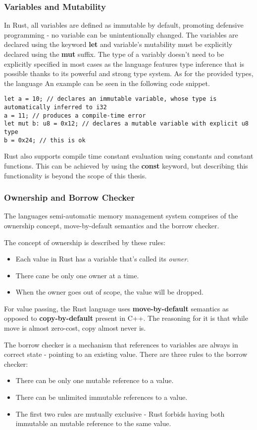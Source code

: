 \subsubsection{Variables and Mutability}
In Rust, all variables are defined as immutable by default, promoting defensive programming - no variable can be unintentionally changed.
The variables are declared using the keyword \textbf{let} and variable's mutability must be explicitly declared using the \textbf{mut} suffix.
The type of a variably doesn't need to be explicitly specified in most cases as the language features type inference that is possible thanks to its powerful and strong type system.
As for the provided types, the language
An example can be seen in the following code snippet.

\begin{lstlisting}
let a = 10; // declares an immutable variable, whose type is automatically inferred to i32
a = 11; // produces a compile-time error
let mut b: u8 = 0x12; // declares a mutable variable with explicit u8 type
b = 0x24; // this is ok
\end{lstlisting}

Rust also supports compile time constant evaluation using constants and constant functions.
This can be achieved by using the \textbf{const} keyword, but describing this functionality is beyond the scope of this thesis.

\subsubsection{Ownership and Borrow Checker}
The languages semi-automatic memory management system comprises of the ownership concept, move-by-default semantics and the borrow checker.

The concept of ownership is described by these rules\cite{klabnik_rust_nodate}:
\begin{itemize}
    \item Each value in Rust has a variable that's called its \textit{owner}.
    \item There cane be only one owner at a time.
    \item When the owner goes out of scope, the value will be dropped.
\end{itemize}
For value passing, the Rust language uses \textbf{move-by-default} semantics as opposed to \textbf{copy-by-default} present in C++.
The reasoning for it is that while move is almost zero-cost, copy almost never is.

The borrow checker is a mechanism that references to variables are always in correct state - pointing to an existing value.
There are three rules to the borrow checker:
\begin{itemize}
    \item There can be only one mutable reference to a value.
    \item There can be unlimited immutable references to a value.
    \item The first two rules are mutually exclusive - Rust forbids having both immutable an mutable reference to the same value.
\end{itemize}

